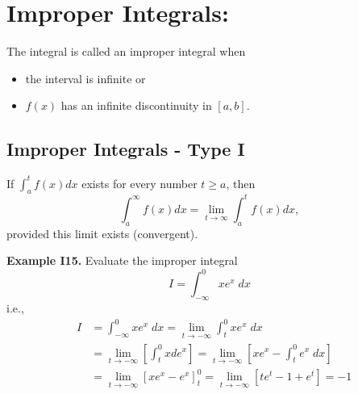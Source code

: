 \documentclass{article}
\begin{document}
%
%

\section{Improper Integrals:} 

The integral is called an improper integral when
\begin{itemize}
\item
the interval is infinite or
\item
$f(x)$ has an infinite discontinuity in $[a,b]$.
\end{itemize}

\subsection{Improper Integrals - Type I}

If $\int_a^t f(x) dx $ exists for every number $t \geq a$,
then
$$
\int_a^{\infty} f(x) dx = \lim_{t \to \infty} \int_a^{t} f(x) dx,
$$
provided this limit exists (convergent).

\hrulefill

\textbf{Example I15.} Evaluate  the improper integral
$$
I=\int_{-\infty}^0 x e^x \;   dx
$$
i.e.,
\begin{eqnarray}
& I & =\int_{-\infty}^0 x e^x \;   dx=\lim_{t \to -\infty} \int_{t}^0 x e^x \;  d x  \; \;  \nonumber\\
&   & = \lim_{t \to -\infty}  \left[ \int_{t}^0 x  d e^x \right]= \lim_{t \to -\infty}  \left[ xe^x - \int_{t}^0  e^x \; dx
\right]\nonumber\\
&   & = \lim_{t \to -\infty}  \left[ xe^x -   e^x \right]_t^0 = \lim_{t \to -\infty}  \left[ te^t -  1 + e^t \right]= -1
\nonumber
\end{eqnarray}
\end{document}
